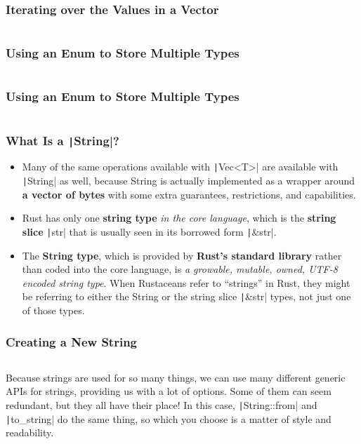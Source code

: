 \documentclass{beamer}
\begin{document}
\begin{frame}[fragile]
	\frametitle{Iterating over the Values in a Vector}
	\inputminted{rust}{./code/vector3.rs}
\end{frame}

\begin{frame}[fragile]
	\frametitle{Using an Enum to Store Multiple Types}
	\inputminted{rust}{./code/vector4.rs}
\end{frame}

\begin{frame}[fragile]
	\frametitle{Using an Enum to Store Multiple Types}
	\inputminted{rust}{./code/vector4.rs}
\end{frame}

\begin{frame}[fragile]
	\frametitle{What Is a \texttt|String|?}
	
	\begin{itemize}
		\item 	Many of the same operations available with \texttt|Vec<T>|  are available with \texttt|String| as well, because String is actually implemented as a wrapper around \textbf{a vector of bytes} with some extra guarantees, restrictions, and capabilities.
		\item 	Rust has only one \textbf{string type}\textit{ in the core language}, which is the \textbf{string slice} \texttt|str| that is usually seen in its borrowed form \texttt|&str|. 
		\item 	The \textbf{String type}, which is provided by\textbf{ Rust’s standard library} rather than coded into the core language, is \textit{a growable, mutable, owned, UTF-8 encoded string type}. When Rustaceans refer to “strings” in Rust, they might be referring to either the String or the string slice \texttt|&str| types, not just one of those types. 
	\end{itemize}
\end{frame}


\begin{frame}[fragile]
	\frametitle{Creating a New String}
	\inputminted{rust}{./code/string_vec.rs}
	
	Because strings are used for so many things, we can use many different generic APIs for strings, providing us with a lot of options. Some of them can seem redundant, but they all have their place! In this case, \texttt|String::from| and \texttt|to_string| do the same thing, so which you choose is a matter of style and readability.
\end{frame}
\end{document}
